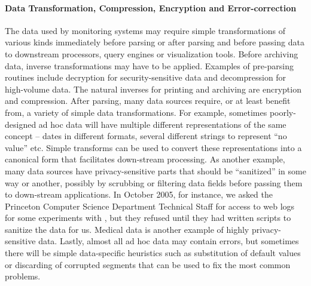 \paragraph*{Data Transformation, Compression, Encryption and Error-correction}
The data used by monitoring systems may require simple transformations 
of various kinds
immediately before parsing or after parsing and before
passing data to downstream processors, query engines or 
visualization tools.  Before archiving data,
inverse transformations may have to be applied.  
Examples of pre-parsing routines include decryption for
security-sensitive data and decompression for high-volume data.  
The natural inverses for printing and archiving 
are encryption and compression.
After parsing, many data sources require, or at least benefit from,
a variety of simple data transformations.  For example,
sometimes poorly-designed
ad hoc data will have multiple different representations
of the same concept -- dates in different formats, several different strings
to represent ``no value'' etc.  Simple transforms can be used to convert
these representations into a canonical form that facilitates down-stream
processing.  As another example, many data sources have privacy-sensitive parts
that should be ``sanitized'' in some way or another, possibly by scrubbing or
filtering data fields before passing them to down-stream applications.
In October 2005, for instance, we asked the Princeton Computer Science
Department Technical Staff for access to web logs for some experiments
with \pads, but they refused until they had written scripts to
sanitize the data for us.  Medical data is another example of highly
privacy-sensitive data.
Lastly, almost all ad hoc data may contain errors, but sometimes there 
will be simple data-specific heuristics such as substitution of default values
or discarding of corrupted segments
that can be used to fix the most common problems.

